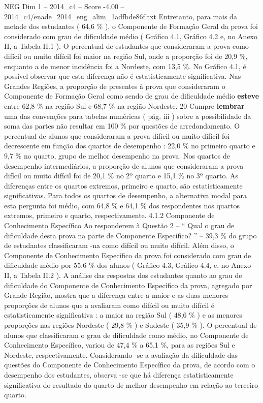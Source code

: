 \begin{textsample}{NEG Dim 1 – 2014\_c4 – Score -4.00 – 2014\_c4/enade\_2014\_eng\_alim\_1adfbde86f.txt}
Entretanto, para mais da metade dos estudantes ( 64,6 \% ), o Componente de Formação Geral da prova foi considerado com grau de dificuldade médio ( Gráfico 4.1, Gráfico 4.2 e, no Anexo II, a Tabela II.1 ).
O percentual de estudantes que consideraram a prova como difícil ou muito difícil foi maior na região Sul, onde a proporção foi de 20,9 \%, enquanto a de menor incidência foi a Nordeste, com 13,5 \%.
No Gráfico 4.1, é possível observar que esta diferença não é estatisticamente significativa.
Nas Grandes Regiões, a proporção de presentes à prova que consideraram o Componente de Formação Geral como sendo de grau de dificuldade médio \textbf{esteve} entre 62,8 \% na região Sul e 68,7 \% na região Nordeste. 20 Cumpre \textbf{lembrar} uma das convenções para tabelas numéricas ( pág. iii ) sobre a possibilidade da soma das partes não resultar em 100 \% por questões de arredondamento.
O percentual de alunos que consideraram a prova difícil ou muito difícil foi decrescente em função dos quartos de desempenho : 22,0 \% no primeiro quarto e 9,7 \% no quarto, grupo de melhor desempenho na prova.
Nos quartos de desempenho intermediários, a proporção de alunos que consideraram a prova difícil ou muito difícil foi de 20,1 \% no 2º quarto e 15,1 \% no 3º quarto.
As diferenças entre os quartos extremos, primeiro e quarto, são estatisticamente significativas.
Para todos os quartos de desempenho, a alternativa modal para esta pergunta foi médio, com 64,8 \% e 64,1 \% dos respondentes nos quartos extremos, primeiro e quarto, respectivamente. 4.1.2 Componente de Conhecimento Específico Ao responderem à Questão 2 – “ Qual o grau de dificuldade desta prova na parte de Componente Específico? ” – 39,3 \% do grupo de estudantes classificaram -na como difícil ou muito difícil.
Além disso, o Componente de Conhecimento Específico da prova foi considerado com grau de dificuldade médio por 55,6 \% dos alunos ( Gráfico 4.3, Gráfico 4.4, e, no Anexo II, a Tabela II.2 ).
A análise das respostas dos estudantes quanto ao grau de dificuldade do Componente de Conhecimento Específico da prova, agregado por Grande Região, mostra que a diferença entre a maior e as duas menores proporções de alunos que a avaliaram como difícil ou muito difícil é estatisticamente significativa : a maior na região Sul ( 48,6 \% ) e as menores proporções nas regiões Nordeste ( 29,8 \% ) e Sudeste ( 35,9 \% ).
O percentual de alunos que classificaram o grau de dificuldade como médio, no Componente de Conhecimento Específico, variou de 47,4 \% a 65,1 \%, para as regiões Sul e Nordeste, respectivamente.
Considerando -se a avaliação da dificuldade das questões do Componente de Conhecimento Específico da prova, de acordo com o desempenho dos estudantes, observa -se que há diferença estatisticamente significativa do resultado do quarto de melhor desempenho em relação ao terceiro quarto.

\end{textsample}
